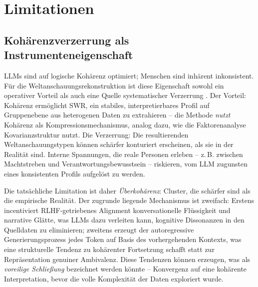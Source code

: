\documentclass[11pt,a4paper]{article}
\begin{document}
\section{Limitationen}
\label{sec:limitations}

\subsection{Koh\"arenzverzerrung als Instrumenteneigenschaft}
\label{sec:limitations:coherence}

LLMs sind auf logische Koh\"arenz optimiert; Menschen sind inh\"arent inkonsistent. F\"ur die Weltanschauungsrekonstruktion ist diese Eigenschaft sowohl ein operativer Vorteil als auch eine Quelle systematischer Verzerrung \citep{Geiger2026PaperA}. Der Vorteil: Koh\"arenz erm\"oglicht SWR, ein stabiles, interpretierbares Profil auf Gruppenebene aus heterogenen Daten zu extrahieren -- die Methode \emph{nutzt} Koh\"arenz als Kompressionsmechanismus, analog dazu, wie die Faktorenanalyse Kovarianzstruktur nutzt. Die Verzerrung: Die resultierenden Weltanschauungstypen k\"onnen sch\"arfer konturiert erscheinen, als sie in der Realit\"at sind. Interne Spannungen, die reale Personen erleben -- z.\,B. zwischen Machtstreben und Verantwortungsbewusstsein -- riskieren, vom LLM zugunsten eines konsistenten Profils aufgel\"ost zu werden.

Die tats\"achliche Limitation ist daher \emph{\"Uberkoh\"arenz}: Cluster, die sch\"arfer sind als die empirische Realit\"at. Der zugrunde liegende Mechanismus ist zweifach: Erstens incentiviert RLHF-getriebenes Alignment konversationelle Fl\"ussigkeit und narrative Gl\"atte, was LLMs dazu verleiten kann, kognitive Dissonanzen in den Quelldaten zu eliminieren; zweitens erzeugt der autoregressive Generierungsprozess jedes Token auf Basis des vorhergehenden Kontexts, was eine strukturelle Tendenz zu koh\"arenter Fortsetzung schafft statt zur Repr\"asentation genuiner Ambivalenz. Diese Tendenzen k\"onnen erzeugen, was als \emph{voreilige Schlie\ss{}ung} bezeichnet werden k\"onnte -- Konvergenz auf eine koh\"arente Interpretation, bevor die volle Komplexit\"at der Daten exploriert wurde.
\end{document}
